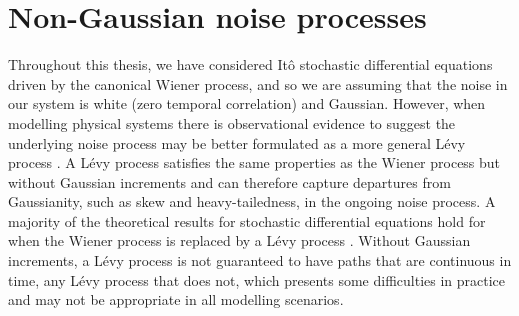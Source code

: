 



\section{Non-Gaussian noise processes}\label{sec:disc_levy}
Throughout this thesis, we have considered It\^o stochastic differential equations driven by the canonical Wiener process, and so we are assuming that the noise in our system is white (zero temporal correlation) and Gaussian.
However, when modelling physical systems there is observational evidence to suggest the underlying noise process may be better formulated as a more general L\'evy process \citep{Ditlevsen_1999_ObservationAstableNoise, Viecelli_1998_PossibilitySingularLowFrequency}.
A L\'evy process satisfies the same properties as the Wiener process but without Gaussian increments and can therefore capture departures from Gaussianity, such as skew and heavy-tailedness, in the ongoing noise process.
A majority of the theoretical results for stochastic differential equations hold for when the Wiener process is replaced by a L\'evy process \citep{Applebaum_2004_LevyProcessesStochastic}.
Without Gaussian increments, a L\'evy process is not guaranteed to have paths that are continuous in time, any L\'evy process that does not, which presents some difficulties in practice and may not be appropriate in all modelling scenarios.

